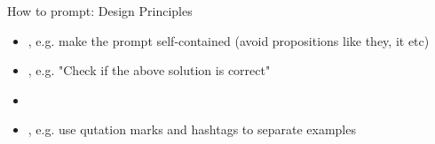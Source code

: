 \documentclass[10pt]{beamer}
\begin{document}
\begin{frame}{How to prompt: Design Principles}

\begin{itemize}
\item {}, e.g. make the prompt self-contained (avoid propositions like they, it etc)
\pause
\item {}, e.g. "Check if the above solution is correct"
\item {}
\item {}, e.g. use qutation marks and hashtags to separate examples
\end{itemize}

\end{frame}








\end{document}
